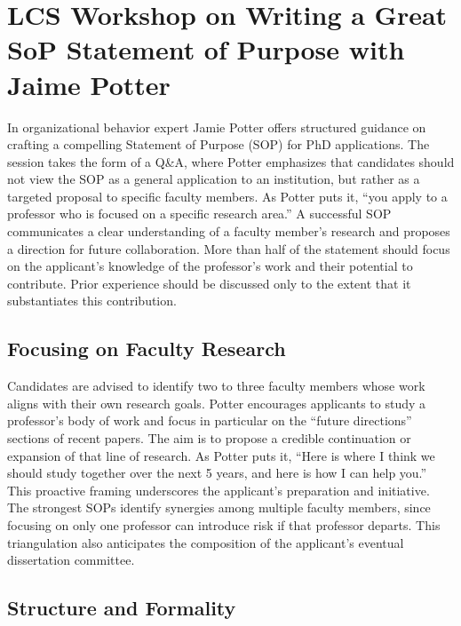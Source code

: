 
\section{LCS Workshop on Writing a Great SoP Statement of Purpose with Jaime Potter}
\label{sec:sop_workshop}

In organizational behavior expert Jamie Potter offers structured guidance on crafting a compelling Statement of Purpose (SOP) for PhD applications.
The session takes the form of a Q\&A, where Potter emphasizes that candidates should not view the SOP as a general application to an institution, but rather as a targeted proposal to specific faculty members.
As Potter puts it, ``you apply to a professor who is focused on a specific research area.''
A successful SOP communicates a clear understanding of a faculty member's research and proposes a direction for future collaboration.
More than half of the statement should focus on the applicant's knowledge of the professor's work and their potential to contribute.
Prior experience should be discussed only to the extent that it substantiates this contribution.

\subsection{Focusing on Faculty Research}

Candidates are advised to identify two to three faculty members whose work aligns with their own research goals.
Potter encourages applicants to study a professor's body of work and focus in particular on the ``future directions'' sections of recent papers.
The aim is to propose a credible continuation or expansion of that line of research.
As Potter puts it, ``Here is where I think we should study together over the next 5 years, and here is how I can help you.''
This proactive framing underscores the applicant's preparation and initiative.
The strongest SOPs identify synergies among multiple faculty members, since focusing on only one professor can introduce risk if that professor departs.
This triangulation also anticipates the composition of the applicant's eventual dissertation committee.

\subsection{Structure and Formality}

